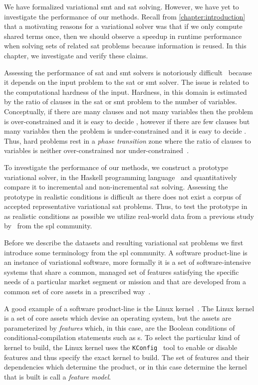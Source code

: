 \label{chapter:case-studies}
%
We have formalized variational \ac{smt} and \ac{sat} solving. However, we have
yet to investigate the performance of our methods. Recall from
\autoref{chapter:introduction} that a motivating reasons for a variational
solver was that if we only compute shared terms once, then we should observe a
speedup in runtime performance when solving sets of related \ac{sat} problems
because information is reused. In this chapter, we investigate and verify these
claims.

Assessing the performance of \ac{sat} and \ac{smt} solvers is notoriously
difficult~\cite{Gent94thesat} because it depends on the input problem to the
\ac{sat} or \ac{smt} solver. The issue is related to the computational hardness
of the input. Hardness, in this domain is estimated by the ratio of clauses in
the \ac{sat} or \ac{smt} problem to the number of variables. Conceptually, if
there are many clauses and not many variables then the problem is
over-constrained and it is easy to decide , however if there are few
clauses but many variables then the problem is under-constrained and it is easy
to decide . Thus, hard problems rest in a \emph{phase transition} zone
where the ratio of clauses to variables is neither over-constrained nor
under-constrained~\cite{Gent94thesat}.

To investigate the performance of our methods, we construct a prototype
variational solver, \vsat{} in the Haskell programming
language~\cite{Hudak:1992:RPL:130697.130699} and quantitatively compare it to
incremental and non-incremental \ac{sat} solving. Assessing the prototype in
realistic conditions is difficult as there does not exist a corpus of accepted
representative variational \ac{sat} problems. Thus, to test the prototype in as
realistic conditions as possible we utilize real-world data from a previous
study by~\citet{NMS+:GPCE18} from the \ac{spl} community.

Before we describe the datasets and resulting variational \ac{sat} problems we
first introduce some terminology from the \ac{spl} community. A software
product-line is an instance of variational software, more formally it is a set
of software-intensive systems that share a common, managed set of features
satisfying the specific needs of a particular market segment or mission and that
are developed from a common set of core assets in a prescribed
way~\cite{ABKS13,CE00,PBL05}.

A good example of a software product-line is the Linux kernel~\cite{linux}. The
Linux kernel is a set of core assets which devise an operating system, but the
assets are parameterized by \emph{features} which, in this case, are the Boolean
conditions of conditional-compilation statements such as s. To select
the particular kind of kernel to build, the Linux kernel uses the
\texttt{KConfig}~\cite{kconfig} tool to enable or disable features and thus
specify the exact kernel to build. The set of features and their dependencies
which determine the product, or in this case determine the kernel that is built
is call a \emph{feature model}\cite{KCHNP90}.

